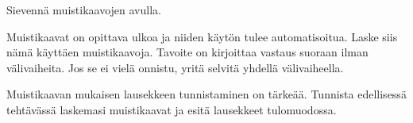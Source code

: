 \begin{tehtavasivu}
\begin{tehtava}
    Sievennä muistikaavojen avulla.
    \begin{vastaus}
    \end{vastaus}
\end{tehtava}

\begin{tehtava}
   	Muistikaavat on opittava ulkoa ja niiden käytön tulee automatisoitua. Laske siis nämä käyttäen muistikaavoja. Tavoite on kirjoittaa vastaus suoraan ilman välivaiheita. Jos se ei vielä onnistu, yritä selvitä yhdellä välivaiheella.
    \begin{vastaus}
    \end{vastaus}
\end{tehtava}

\begin{tehtava}
    Muistikaavan mukaisen lausekkeen tunnistaminen on tärkeää. Tunnista edellisessä tehtävässä laskemasi muistikaavat ja esitä lausekkeet tulomuodossa.
    \begin{vastaus}
    \end{vastaus}
\end{tehtava}


\end{tehtavasivu}

